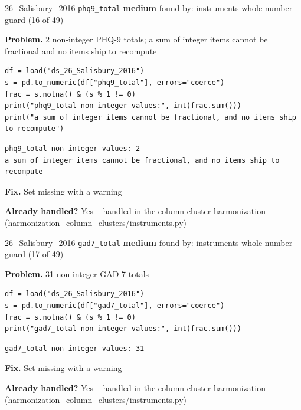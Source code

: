 \documentclass[9pt, t, handout]{beamer}
\newcommand{\ans}[1]{\textcolor{structure.fg}{#1}}
\begin{document}
\begin{frame}[fragile]{26\_Salisbury\_2016 \quad \texttt{phq9\_total}}
  {\scriptsize\textcolor{blue!55!black}{\textbf{medium}} \quad
   found by: instruments whole-number guard \quad (16 of 49)}
  \vspace{3pt}

  {\footnotesize \textbf{Problem.} 2 non-integer PHQ-9 totals; a sum of integer items cannot be fractional and no items ship to recompute}
  \vspace{4pt}

  \begin{Verbatim}[fontsize=\tiny, frame=single, framesep=2pt, label=\tiny reproduce]
df = load("ds_26_Salisbury_2016")
s = pd.to_numeric(df["phq9_total"], errors="coerce")
frac = s.notna() & (s % 1 != 0)
print("phq9_total non-integer values:", int(frac.sum()))
print("a sum of integer items cannot be fractional, and no items ship to recompute")
  \end{Verbatim}
  \begin{Verbatim}[fontsize=\tiny, frame=single, framesep=2pt, label=\tiny output]
phq9_total non-integer values: 2
a sum of integer items cannot be fractional, and no items ship to recompute
  \end{Verbatim}
  \vspace{2pt}

  {\footnotesize \textbf{Fix.} Set missing with a warning}
  \vspace{2pt}

  {\footnotesize \textbf{Already handled?} \ans{Yes} -- handled in the column-cluster harmonization
   (harmonization\_column\_clusters/instruments.py)}
\end{frame}


\begin{frame}[fragile]{26\_Salisbury\_2016 \quad \texttt{gad7\_total}}
  {\scriptsize\textcolor{blue!55!black}{\textbf{medium}} \quad
   found by: instruments whole-number guard \quad (17 of 49)}
  \vspace{3pt}

  {\footnotesize \textbf{Problem.} 31 non-integer GAD-7 totals}
  \vspace{4pt}

  \begin{Verbatim}[fontsize=\tiny, frame=single, framesep=2pt, label=\tiny reproduce]
df = load("ds_26_Salisbury_2016")
s = pd.to_numeric(df["gad7_total"], errors="coerce")
frac = s.notna() & (s % 1 != 0)
print("gad7_total non-integer values:", int(frac.sum()))
  \end{Verbatim}
  \begin{Verbatim}[fontsize=\tiny, frame=single, framesep=2pt, label=\tiny output]
gad7_total non-integer values: 31
  \end{Verbatim}
  \vspace{2pt}

  {\footnotesize \textbf{Fix.} Set missing with a warning}
  \vspace{2pt}

  {\footnotesize \textbf{Already handled?} \ans{Yes} -- handled in the column-cluster harmonization
   (harmonization\_column\_clusters/instruments.py)}
\end{frame}
\end{document}
